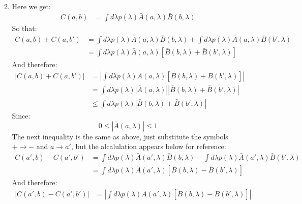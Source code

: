 \documentclass[12pt,a4]{article}
\begin{document}
\begin{enumerate}
\begin{enumerate}
\begin{align*}
        \end{align*}
      \item
        Here we get:
        \begin{align*}
          C(a,b) &= \int d\lambda p(\lambda) \bar{A}(a, \lambda)\bar{B}(b, \lambda) 
        \end{align*}
        So that:
        \begin{align*}
          C(a,b) + C(a,b') &= \int d\lambda p(\lambda) \bar{A}(a, \lambda)\bar{B}(b, \lambda) + \int d\lambda p(\lambda) \bar{A}(a, \lambda)\bar{B}(b', \lambda)\\
                           &= \int d\lambda p(\lambda) \bar{A}(a, \lambda)\left[\bar{B}(b, \lambda) + \bar{B}(b', \lambda)\right]
        \end{align*}
        And therefore:
        \begin{align*}
          |C(a,b) + C(a,b')| 
                             &= \left|\int d\lambda p(\lambda) \bar{A}(a, \lambda)\left[\bar{B}(b, \lambda) + \bar{B}(b', \lambda)\right]\right|\\
                             &= \int d\lambda p(\lambda) \left|\bar{A}(a, \lambda)\right| \left|\bar{B}(b, \lambda) + \bar{B}(b', \lambda)\right|\\
                             &\leq \int d\lambda p(\lambda) \left|\bar{B}(b, \lambda) + \bar{B}(b', \lambda)\right|
        \end{align*}
        Since:
        \begin{equation*}
          0 \le \left|\bar{A}(a, \lambda)\right| \le 1
        \end{equation*}
        The next inequality is the same as above, just substitute the symbols $+ \to -$ and $a \to a'$, but the alcalulation appears below for reference:
        \begin{align*}
          C(a',b) - C(a',b') &= \int d\lambda p(\lambda) \bar{A}(a', \lambda)\bar{B}(b, \lambda) - \int d\lambda p(\lambda) \bar{A}(a', \lambda)\bar{B}(b', \lambda)\\
                             &= \int d\lambda p(\lambda) \bar{A}(a', \lambda)\left[\bar{B}(b, \lambda) - \bar{B}(b', \lambda)\right]
        \end{align*}
        And therefore:
        \begin{align*}
          |C(a',b) - C(a',b')| 
                             &= \left|\int d\lambda p(\lambda) \bar{A}(a', \lambda)\left[\bar{B}(b, \lambda) - \bar{B}(b', \lambda)\right]\right|\\

\end{align*}
\end{enumerate}
\end{enumerate}
\end{document}
